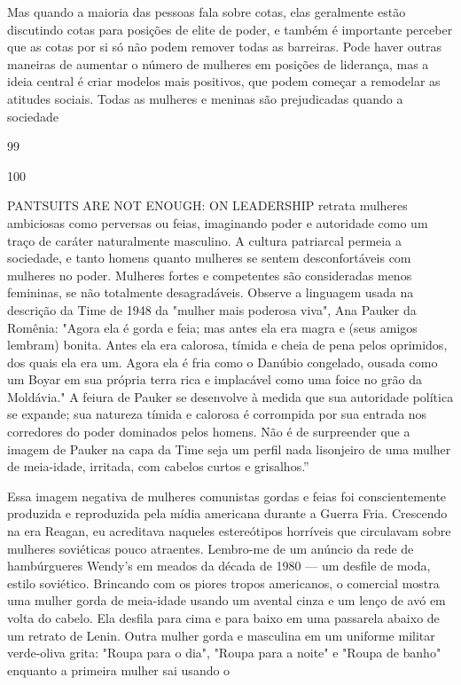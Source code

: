  \par 
Mas quando a maioria das pessoas fala sobre cotas, elas geralmente estão discutindo cotas para posições de elite de poder, e também é importante perceber que as cotas por si só não podem remover todas as barreiras. Pode haver outras maneiras de aumentar o número de mulheres em posições de liderança, mas a ideia central é criar modelos mais positivos, que podem começar a remodelar as atitudes sociais. Todas as mulheres e meninas são prejudicadas quando a sociedade
 \par 
99
 \par 
100
 \par 
PANTSUITS ARE NOT ENOUGH: ON LEADERSHIP retrata mulheres ambiciosas como perversas ou feias, imaginando poder e autoridade como um traço de caráter naturalmente masculino. A cultura patriarcal permeia a sociedade, e tanto homens quanto mulheres se sentem desconfortáveis ​​com mulheres no poder. Mulheres fortes e competentes são consideradas menos femininas, se não totalmente desagradáveis. Observe a linguagem usada na descrição da Time de 1948 da "mulher mais poderosa viva", Ana Pauker da Romênia: "Agora ela é gorda e feia; mas antes ela era magra e (seus amigos lembram) bonita. Antes ela era calorosa, tímida e cheia de pena pelos oprimidos, dos quais ela era um. Agora ela é fria como o Danúbio congelado, ousada como um Boyar em sua própria terra rica e implacável como uma foice no grão da Moldávia." A feiura de Pauker se desenvolve à medida que sua autoridade política se expande; sua natureza tímida e calorosa é corrompida por sua entrada nos corredores do poder dominados pelos homens. Não é de surpreender que a imagem de Pauker na capa da Time seja um perfil nada lisonjeiro de uma mulher de meia-idade, irritada, com cabelos curtos e grisalhos.”
 \par 
Essa imagem negativa de mulheres comunistas gordas e feias foi conscientemente produzida e reproduzida pela mídia americana durante a Guerra Fria. Crescendo na era Reagan, eu acreditava naqueles estereótipos horríveis que circulavam sobre mulheres soviéticas pouco atraentes. Lembro-me de um anúncio da rede de hambúrgueres Wendy's em meados da década de 1980 — um desfile de moda, estilo soviético. Brincando com os piores tropos americanos, o comercial mostra uma mulher gorda de meia-idade usando um avental cinza e um lenço de avó em volta do cabelo. Ela desfila para cima e para baixo em uma passarela abaixo de um retrato de Lenin. Outra mulher gorda e masculina em um uniforme militar verde-oliva grita: "Roupa para o dia", "Roupa para a noite" e "Roupa de banho" enquanto a primeira mulher sai usando o
